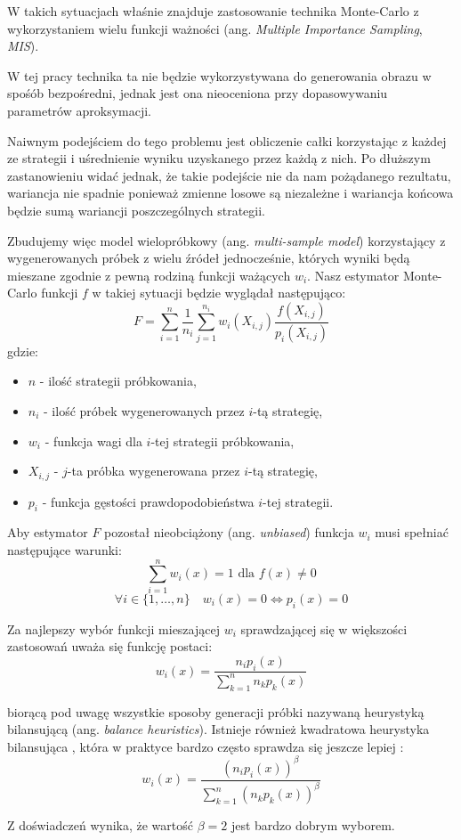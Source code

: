 \documentclass[../main.tex]{subfiles}
\begin{document}
W takich sytuacjach właśnie znajduje zastosowanie technika Monte-Carlo z wykorzystaniem wielu funkcji ważności (ang. \textit{Multiple Importance Sampling}, \textit{MIS}).

W tej pracy technika ta nie będzie wykorzystywana do generowania obrazu w spośób bezpośredni, jednak jest ona nieoceniona przy dopasowywaniu parametrów aproksymacji.

Naiwnym podejściem do tego problemu jest obliczenie całki korzystając z każdej ze strategii i uśrednienie wyniku uzyskanego przez każdą z nich. Po dłuższym zastanowieniu widać jednak, że takie podejście nie da nam pożądanego rezultatu, wariancja nie spadnie ponieważ zmienne losowe są niezależne i wariancja końcowa będzie sumą wariancji poszczególnych strategii.

Zbudujemy więc model wielopróbkowy (ang. \textit{multi-sample model}) \cite{pbrt,ImportanceSamplingForProduction} korzystający z wygenerowanych próbek z wielu źródeł jednocześnie, których wyniki będą mieszane zgodnie z pewną rodziną funkcji ważących $w_i$. Nasz estymator Monte-Carlo funkcji $f$ w takiej sytuacji będzie wyglądał następująco:
\[
  F = \sum_{i=1}^{n} \frac{1}{n_i} \sum_{j=1}^{n_i} w_{i}(X_{i,j}) \frac{
    f(X_{i,j})
  }{
    p_{i}(X_{i,j})
  }
\]
\noindent gdzie:
\begin{itemize}
	\item $n$ - ilość strategii próbkowania,
	\item $n_i$ - ilość próbek wygenerowanych przez $i$-tą strategię,
	\item $w_i$ - funkcja wagi dla $i$-tej strategii próbkowania,
	\item $X_{i,j}$ - $j$-ta próbka wygenerowana przez $i$-tą strategię,
	\item $p_i$ - funkcja gęstości prawdopodobieństwa $i$-tej strategii.
\end{itemize}

Aby estymator $F$ pozostał nieobciążony (ang. \textit{unbiased}) funkcja $w_i$ musi spełniać następujące warunki:
\[ \sum_{i = 1}^{n} w_{i}(x) = 1 \text{ dla } f(x) \neq 0 \]
\[
  \forall i \in \{ 1, \ldots, n \} \quad
  w_{i}(x) = 0 \Leftrightarrow p_i(x) = 0
\]

Za najlepszy wybór funkcji mieszającej $w_i$ sprawdzającej się w większości zastosowań uważa się funkcję postaci:
\[
  w_{i}(x) = \frac{
    n_{i} p_{i}(x)
  }{
    \sum_{k=1}^{n} {
      n_{k} p_{k}(x)
    }
  }
\]

\noindent biorącą pod uwagę wszystkie sposoby generacji próbki nazywaną heurystyką bilansującą (ang. \textit{balance heuristics}). Istnieje również kwadratowa heurystyka bilansująca \cite{pbrt}, która w praktyce bardzo często sprawdza się jeszcze lepiej \cite{pbrt,Veach}:
\[
  w_{i}(x) = 
  \frac{
	\left( n_{i} p_{i}(x) \right)^{\beta}
  }{
	\sum_{k=1}^{n} {
		\left(n_{k} p_{k}(x)\right)^{\beta}
	}
  }
\]

Z doświadczeń \cite{Veach} wynika, że wartość $\beta = 2$ jest bardzo dobrym wyborem.
\end{document}

